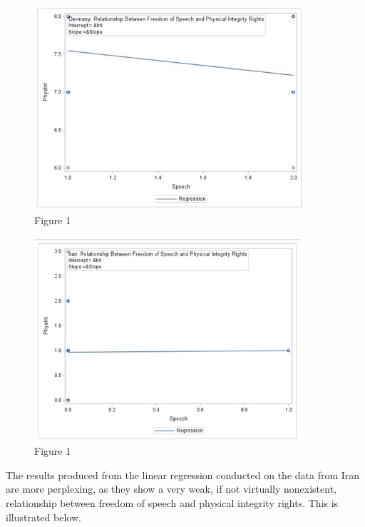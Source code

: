 \documentclass{article}
\begin{document}
\begin{figure}[htp]
    \centering
    \includegraphics[width=10cm]{Germany.png}
    \caption{Figure 1}
    \label{fig:Germany}
\end{figure}

\begin{figure}[htp]
    \centering
    \includegraphics[width=10cm]{Iran.png}
    \caption{Figure 1}
    \label{fig:Iran}
\end{figure}

The results produced from the linear regression conducted on the data from Iran are more perplexing, as they show a very weak, if not virtually nonexistent, relationship between freedom of speech and physical integrity rights. This is illustrated below.
\end{document}
